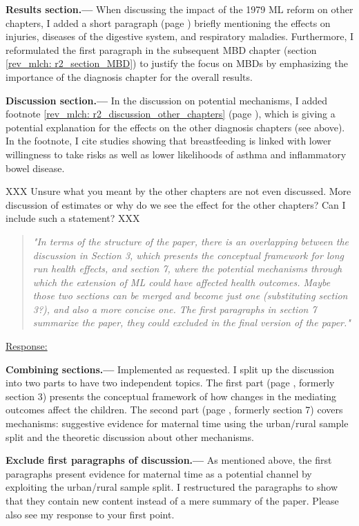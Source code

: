\textbf{Results section.---} When discussing the impact of the 1979 ML reform on other chapters, I added a short paragraph (page \pageref{rev_mlch: r2_results_other chapters}) briefly mentioning the effects on injuries, diseases of the digestive system, and respiratory maladies. Furthermore, I reformulated the first paragraph in the subsequent MBD chapter (section \ref{rev_mlch: r2_section_MBD}) to justify the focus on MBDs by emphasizing the importance of the diagnosis chapter for the overall results.

\textbf{Discussion section.---} In the discussion on potential mechanisms, I added footnote \ref{rev_mlch: r2_discussion_other_chapters} (page \pageref{rev_mlch: r2_discussion_other_chapters}), which is giving a potential explanation for the effects on the other diagnosis chapters (see above). In the footnote, I cite studies showing that breastfeeding is linked with lower willingness to take risks as well as lower likelihoods of asthma and inflammatory bowel disease.


XXX Unsure what you meant by the other chapters are not even discussed. More discussion of estimates or why do we see the effect for the other chapters?
Can I include such a statement? XXX

\begin{quote}
	\textit{"In terms of the structure of the paper, there is an overlapping between the discussion in Section 3, which presents the conceptual framework for long run health effects, and section 7, where the potential mechanisms through which the extension of ML could have affected health outcomes. Maybe those two sections can be merged and become just one (substituting section 3?), and also a more concise one. The first paragraphs in section 7 summarize the paper, they could excluded in the final version of the paper."}
\end{quote}
\underline{Response:} 

\textbf{Combining sections.---} Implemented as requested. I split up the discussion into two parts to have two independent topics. The first part (page \pageref{rev_mlch: restructure_discussion_framework}, formerly section 3) presents the conceptual framework of how changes in the mediating outcomes affect the children. The second part (page \pageref{ref_mlch: discussion_mechanisms}, formerly section 7) covers mechanisms: suggestive evidence for maternal time using the urban/rural sample split and the theoretic discussion about other mechanisms.



\textbf{Exclude first paragraphs of discussion.---} As mentioned above, the first paragraphs present evidence for maternal time as a potential channel by exploiting the urban/rural sample split. I restructured the paragraphs to show that they contain new content instead of a mere summary of the paper. Please also see my response to your first point.

 

